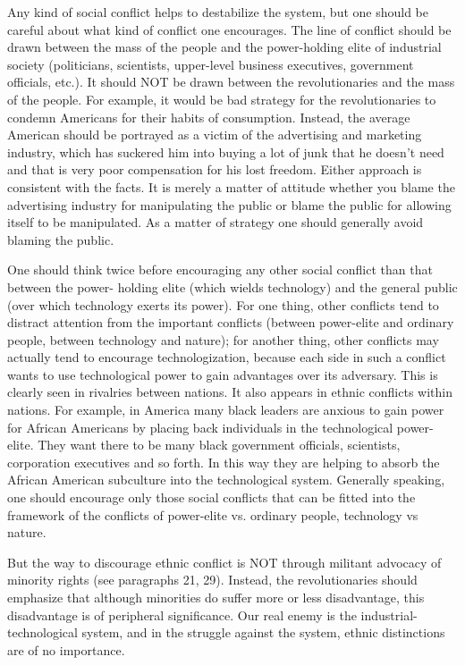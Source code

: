  Any kind of social conflict helps to destabilize the system, but one should be careful about what kind of conflict one encourages. The line of conflict should be drawn between the mass of the people and the power-holding elite of industrial society (politicians, scientists, upper-level business executives, government officials, etc.). It should NOT be drawn between the revolutionaries and the mass of the people. For example, it would be bad strategy for the revolutionaries to condemn Americans for their habits of consumption. Instead, the average American should be portrayed as a victim of the advertising and marketing industry, which has suckered him into buying a lot of junk that he doesn’t need and that is very poor compensation for his lost freedom. Either approach is consistent with the facts. It is merely a matter of attitude whether you blame the advertising industry for manipulating the public or blame the public for allowing itself to be manipulated. As a matter of strategy one should generally avoid blaming the public.

 One should think twice before encouraging any other social conflict than that between the power- holding elite (which wields technology) and the general public (over which technology exerts its power). For one thing, other conflicts tend to distract attention from the important conflicts (between power-elite and ordinary people, between technology and nature); for another thing, other conflicts may actually tend to encourage technologization, because each side in such a conflict wants to use technological power to gain advantages over its adversary. This is clearly seen in rivalries between nations. It also appears in ethnic conflicts within nations. For example, in America many black leaders are anxious to gain power for African Americans by placing back individuals in the technological power-elite. They want there to be many black government officials, scientists, corporation executives and so forth. In this way they are helping to absorb the African American subculture into the technological system. Generally speaking, one should encourage only those social conflicts that can be fitted into the framework of the conflicts of power-elite vs. ordinary people, technology vs nature.

 But the way to discourage ethnic conflict is NOT through militant advocacy of minority rights (see paragraphs 21, 29). Instead, the revolutionaries should emphasize that although minorities do suffer more or less disadvantage, this disadvantage is of peripheral significance. Our real enemy is the industrial- technological system, and in the struggle against the system, ethnic distinctions are of no importance.

